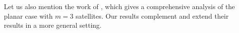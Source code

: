 \documentclass[reqno]{amsart}
\begin{document}
Let us also mention the work of
, which gives a comprehensive analysis of the planar case with $m=3$ satellites. %
Our results complement and extend their results in a more general setting.




\end{document}
